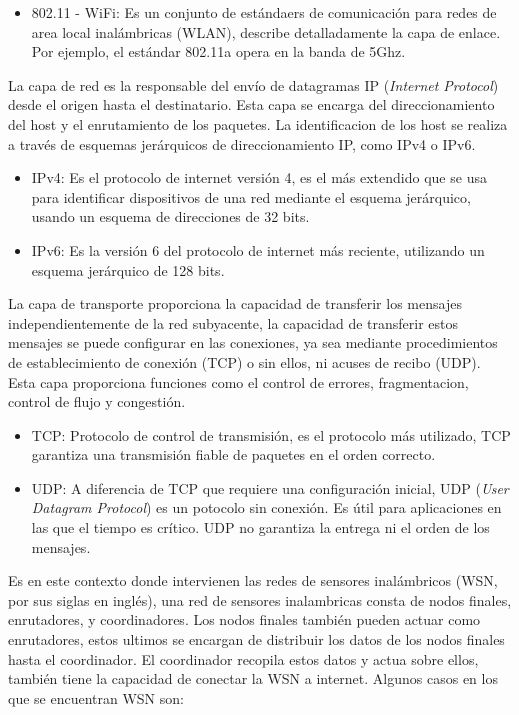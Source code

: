     \begin{itemize}
        \item 802.11 - WiFi: Es un conjunto de estándaers de comunicación para redes de area local inalámbricas (WLAN), describe detalladamente
        la capa de enlace. Por ejemplo, el estándar 802.11a opera en la banda de 5Ghz.
    \end{itemize}

    La capa de red es la responsable del envío de datagramas IP (\textit{Internet Protocol}) desde el origen hasta el destinatario. Esta capa se encarga del direccionamiento 
    del host y el enrutamiento de los paquetes. La identificacion de los host se realiza a través de esquemas jerárquicos de direccionamiento IP, como 
    IPv4 o IPv6.

    \begin{itemize}
        \item IPv4: Es el protocolo de internet versión 4, es el más extendido que se usa para identificar dispositivos de una red mediante el esquema jerárquico, usando un
        esquema de direcciones de 32 bits. 
        \item IPv6: Es la versión 6 del protocolo de internet más reciente, utilizando un esquema jerárquico de 128 bits. 
    \end{itemize}

    La capa de transporte proporciona la capacidad de transferir los mensajes independientemente de la red subyacente, la capacidad de
    transferir estos mensajes se puede configurar en las conexiones, ya sea mediante procedimientos de establecimiento de conexión (TCP)
    o sin ellos, ni acuses de recibo (UDP). Esta capa proporciona funciones como el control de errores, fragmentacion, control de flujo y 
    congestión.

    \begin{itemize}
        \item TCP: Protocolo de control de transmisión, es el protocolo más utilizado, TCP garantiza una transmisión fiable de paquetes en 
        el orden correcto.
        \item UDP: A diferencia de TCP que requiere una configuración inicial, UDP (\textit{User Datagram Protocol}) es un potocolo sin conexión.
        Es útil para aplicaciones en las que el tiempo es crítico. UDP no garantiza la entrega ni el orden de los mensajes.
    \end{itemize}

    Es en este contexto donde intervienen las redes de sensores inalámbricos (WSN, por sus siglas en inglés), una red de sensores inalambricas consta 
    de nodos finales, enrutadores, y coordinadores. Los nodos finales también pueden actuar como enrutadores, estos ultimos se encargan de distribuir 
    los datos de los nodos finales hasta el coordinador. El coordinador recopila estos datos y actua sobre ellos, también tiene la capacidad de conectar
    la WSN a internet. Algunos casos en los que se encuentran WSN son:

